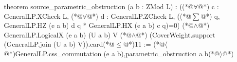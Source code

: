 theorem source_parametric_obstruction (a b : ZMod L) :
    ((*@$\forall$@*) c : GeneralLP.XCheck L, (*@$\forall$@*) d : GeneralLP.ZCheck L,
      ((*@$\sum$@*) q, GeneralLP.HZ (e a b) d q * GeneralLP.HX (e a b) c q)=0) (*@$\land$@*)
    GeneralLP.LogicalX (e a b) (U a b) V (*@$\land$@*)
    (CoverWeight.support (GeneralLP.join (U a b) V)).card(*@$\le$@*)11 :=
  (*@$\langle$@*)GeneralLP.css_commutation (e a b),parametric_obstruction a b(*@$\rangle$@*)

